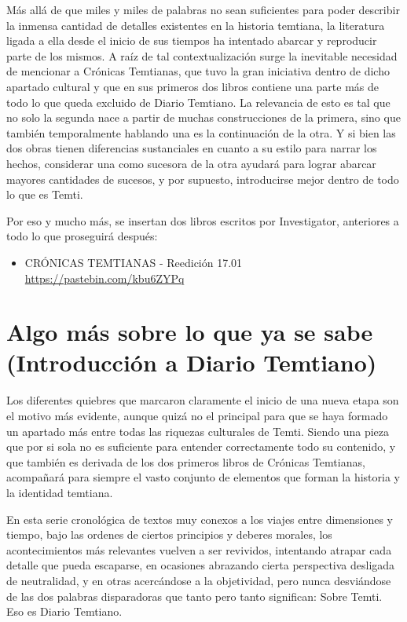 \documentclass[
  spanish,
]{book}
\providecommand{\tightlist}{%
  \setlength{\itemsep}{0pt}\setlength{\parskip}{0pt}}
\begin{document}
Más allá de que miles y miles de palabras no sean suficientes para poder describir la inmensa cantidad de detalles existentes en la historia temtiana, la literatura ligada a ella desde el inicio de sus tiempos ha intentado abarcar y reproducir parte de los mismos. A raíz de tal contextualización surge la inevitable necesidad de mencionar a Crónicas Temtianas, que tuvo la gran iniciativa dentro de dicho apartado cultural y que en sus primeros dos libros contiene una parte más de todo lo que queda excluido de Diario Temtiano.
La relevancia de esto es tal que no solo la segunda nace a partir de muchas construcciones de la primera, sino que también temporalmente hablando una es la continuación de la otra. Y si bien las dos obras tienen diferencias sustanciales en cuanto a su estilo para narrar los hechos, considerar una como sucesora de la otra ayudará para lograr abarcar mayores cantidades de sucesos, y por supuesto, introducirse mejor dentro de todo lo que es Temti.

Por eso y mucho más, se insertan dos libros escritos por Investigator, anteriores a todo lo que proseguirá después:

\begin{itemize}
\tightlist
\item
  CRÓNICAS TEMTIANAS - Reedición 17.01
  \url{https://pastebin.com/kbu6ZYPq}
\end{itemize}

\hypertarget{algo-muxe1s-sobre-lo-que-ya-se-sabe-introducciuxf3n-a-diario-temtiano}{%
\chapter{Algo más sobre lo que ya se sabe (Introducción a Diario Temtiano)}\label{algo-muxe1s-sobre-lo-que-ya-se-sabe-introducciuxf3n-a-diario-temtiano}}

Los diferentes quiebres que marcaron claramente el inicio de una nueva etapa son el motivo más evidente, aunque quizá no el principal para que se haya formado un apartado más entre todas las riquezas culturales de Temti. Siendo una pieza que por si sola no es suficiente para entender correctamente todo su contenido, y que también es derivada de los dos primeros libros de Crónicas Temtianas, acompañará para siempre el vasto conjunto de elementos que forman la historia y la identidad temtiana.

En esta serie cronológica de textos muy conexos a los viajes entre dimensiones y tiempo, bajo las ordenes de ciertos principios y deberes morales, los acontecimientos más relevantes vuelven a ser revividos, intentando atrapar cada detalle que pueda escaparse, en ocasiones abrazando cierta perspectiva desligada de neutralidad, y en otras acercándose a la objetividad, pero nunca desviándose de las dos palabras disparadoras que tanto pero tanto significan: Sobre Temti. Eso es Diario Temtiano.
\end{document}
